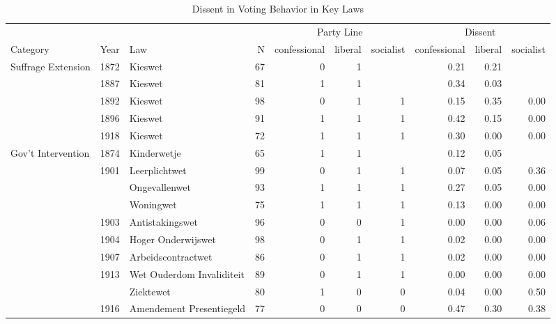 \begin{table}

\caption{\label{tab:descriptivestats_dissent}Dissent in Voting Behavior in Key Laws}
\centering
\begin{tabular}[t]{lllrrrrrrr}
\toprule
\multicolumn{4}{c}{ } & \multicolumn{3}{c}{Party Line} & \multicolumn{3}{c}{Dissent} \\
\cmidrule(l{3pt}r{3pt}){5-7} \cmidrule(l{3pt}r{3pt}){8-10}
Category & Year & Law & N & confessional & liberal & socialist & confessional  & liberal  & socialist \\
\midrule
Suffrage Extension & 1872 & Kieswet & 67 & \num{0} & \num{1} &  & \num{0.21} & \num{0.21} & \\
 & 1887 & Kieswet & 81 & \num{1} & \num{1} &  & \num{0.34} & \num{0.03} & \\
 & 1892 & Kieswet & 98 & \num{0} & \num{1} & \num{1} & \num{0.15} & \num{0.35} & \num{0.00}\\
 & 1896 & Kieswet & 91 & \num{1} & \num{1} & \num{1} & \num{0.42} & \num{0.15} & \num{0.00}\\
 & 1918 & Kieswet & 72 & \num{1} & \num{1} & \num{1} & \num{0.30} & \num{0.00} & \num{0.00}\\
Gov't Intervention & 1874 & Kinderwetje & 65 & \num{1} & \num{1} &  & \num{0.12} & \num{0.05} & \\
 & 1901 & Leerplichtwet & 99 & \num{0} & \num{1} & \num{1} & \num{0.07} & \num{0.05} & \num{0.36}\\
 &  & Ongevallenwet & 93 & \num{1} & \num{1} & \num{1} & \num{0.27} & \num{0.05} & \num{0.00}\\
 &  & Woningwet & 75 & \num{1} & \num{1} & \num{1} & \num{0.13} & \num{0.00} & \num{0.00}\\
 & 1903 & Antistakingswet & 96 & \num{0} & \num{0} & \num{1} & \num{0.00} & \num{0.00} & \num{0.06}\\
 & 1904 & Hoger Onderwijswet & 98 & \num{0} & \num{1} & \num{1} & \num{0.02} & \num{0.00} & \num{0.00}\\
 & 1907 & Arbeidscontractwet & 86 & \num{0} & \num{1} & \num{1} & \num{0.02} & \num{0.00} & \num{0.00}\\
 & 1913 & Wet Ouderdom Invaliditeit & 89 & \num{0} & \num{1} & \num{1} & \num{0.00} & \num{0.00} & \num{0.00}\\
 &  & Ziektewet & 80 & \num{1} & \num{0} & \num{0} & \num{0.04} & \num{0.00} & \num{0.50}\\
 & 1916 & Amendement Presentiegeld & 77 & \num{0} & \num{0} & \num{0} & \num{0.47} & \num{0.30} & \num{0.38}\\

\end{tabular}
\end{table}
